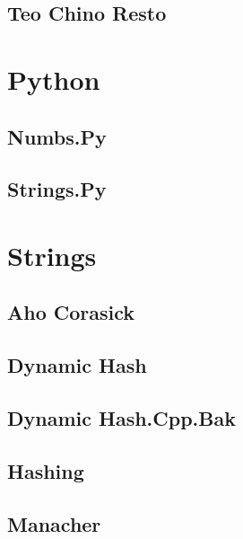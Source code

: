 \documentclass[9pt,portrait,twocolumn,a4paper,notitlepage]{article}
\newcommand\cppfile[2][]{%
\ifstrempty{#1}{}{}%
}
\newcommand\pythonfile[2][]{%
\ifstrempty{#1}{}{}%
}
\begin{document}
\subsection{Teo Chino Resto}
\cppfile{number_theory_clean/teo_chino_resto.cpp}


\section{Python}

\subsection{Numbs.Py}
\pythonfile{Python_clean/numbs.py}

\subsection{Strings.Py}
\pythonfile{Python_clean/strings.py}


\section{Strings}

\subsection{Aho Corasick}
\cppfile{strings_clean/aho_corasick.cpp}

\subsection{Dynamic Hash}
\cppfile{strings_clean/dynamic_Hash.cpp}

\subsection{Dynamic Hash.Cpp.Bak}
\pythonfile{strings_clean/dynamic_Hash.cpp.bak}

\subsection{Hashing}
\cppfile{strings_clean/hashing.cpp}

\subsection{Manacher}
\cppfile{strings_clean/manacher.cpp}
\end{document}
